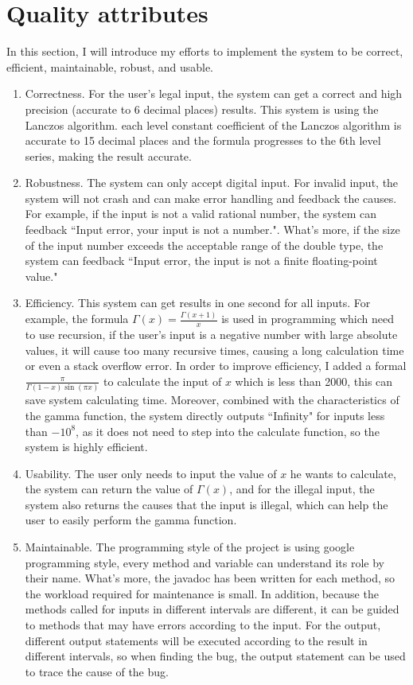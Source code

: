 \documentclass[12pt]{extarticle}
\newcommand{\<}{\langle}
\renewcommand{\>}{\rangle}
\theoremstyle{definition}
\begin{document}
\section{Quality attributes}
\setlength{\parindent}{2em}
In this section, I will introduce my efforts to implement the system to be correct, efficient, maintainable, robust, and usable.
\begin{enumerate}[(1)]
\item Correctness. For the user's legal input, the system can get a correct and high precision (accurate to 6 decimal places) results. This system is using the Lanczos algorithm.
each level constant coefficient of the Lanczos algorithm is accurate to 15 decimal places and the formula progresses to the 6th level series, making the result accurate.
\item Robustness. The system can only accept digital input. For invalid input, the system will not crash and can make error handling and feedback the causes. For example, if the input is not a valid rational number, the system can feedback “Input error, your input is not a number.". What's more, if the size of the input number exceeds the acceptable range of the double type, the system can feedback “Input error, the input is not a finite floating-point value."
\item Efficiency. This system can get results in one second for all inputs. For example, the formula $\Gamma \left( x \right) = \frac{\Gamma \left( x +1\right)}{x}$ is used in programming which need to use recursion, if the user's input is a negative number with large absolute values, it will cause too many recursive times, causing a long calculation time or even a stack overflow error.
\newline
In order to improve efficiency, I added a formal $\frac{\pi }{\Gamma \left( 1-x \right)\sin(\pi x)}$ to calculate the input of $x$ which is less than 2000, this can save system calculating time. Moreover, combined with the characteristics of the gamma function, the system directly outputs “Infinity" for inputs less than $-10^{8}$, as it does not need to step into the calculate function, so the system is highly efficient.
\item Usability. The user only needs to input the value of $x$ he wants to calculate, the system can return the value of $\Gamma \left( x \right)$, and for the illegal input, the system also returns the causes that the input is illegal, which can help the user to easily perform the gamma function.
\item Maintainable. The programming style of the project is using google programming style, every method and variable can understand its role by their name. What's more, the javadoc has been written for each method, so the workload required for maintenance is small. In addition, because the methods called for inputs in different intervals are different, it can be guided to methods that may have errors according to the input. For the output, different output statements will be executed according to the result in different intervals, so when finding the bug, the output statement can be used to trace the cause of the bug.
\end{enumerate}
\end{document}
